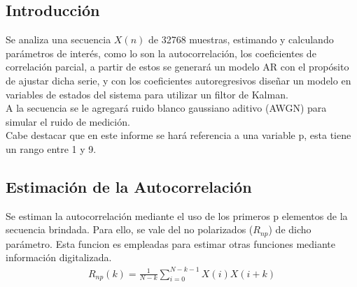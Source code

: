 







\tableofcontents
\newpage



\subsection{Introducción}

Se analiza una secuencia $X(n)$ de 32768 muestras, estimando y calculando parámetros de interés, como lo son la autocorrelación, los coeficientes de correlación parcial, a partir de estos se generará un modelo AR con el propósito de ajustar dicha serie, y con los coeficientes autoregresivos diseñar un modelo en variables de estados del sistema para utilizar un filtor de Kalman.\\
A la secuencia se le agregará ruido blanco gaussiano aditivo (AWGN) para simular el ruido de medición.\\
Cabe destacar que en este informe se hará referencia a una variable p, esta tiene un rango entre 1 y 9.\\

\subsection{Estimación de la Autocorrelación} 

Se estiman la autocorrelación mediante el uso de los primeros p elementos de la secuencia brindada. Para ello, se vale del  no polarizados ($R_{np}$) de dicho parámetro. Esta funcion es  empleadas para estimar otras funciones mediante información digitalizada.
\begin{equation}
\begin{gathered}
	R_{np}(k) = \frac{1}{N-k} \sum_{i=0}^{N-k-1} X(i)X(i+k)
\end{gathered}
\end{equation}


